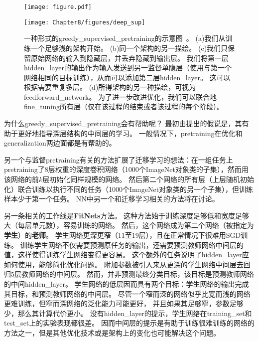 \begin{figure}[!htb]
\ifOpenSource
\centerline{\texttt{[image: figure.pdf]}}
\else
\centerline{\texttt{[image: Chapter8/figures/deep\_sup]}}
\fi
\caption{一种形式的\gls{greedy_supervised_pretraining}的示意图~\citep{Bengio-nips-2006-small}。
(a)我们从训练一个足够浅的架构开始。
(b)同一个架构的另一描绘。
(c)我们只保留原始网络的输入到隐藏层，并丢弃隐藏到输出层。 
我们将第一层\gls{hidden_layer}的输出作为输入发送到另一监督单隐层（使用与第一个网络相同的目标训练），从而可以添加第二层\gls{hidden_layer}。 
这可以根据需要重复多层。
(d)所得架构的另一种描绘，可视为\gls{feedforward_network}。 
为了进一步改进优化，我们可以联合地\gls{fine_tuning}所有层（仅在该过程的结束或者该过程的每个阶段）。
}
\label{fig:chap8_deep_sup}
\end{figure}


为什么\gls{greedy_supervised_pretraining}会有帮助呢？
最初由\cite{Bengio-nips-2006}提出的假说是，其有助于更好地指导深层结构的中间层的学习。
一般情况下，\gls{pretraining}在优化和\gls{generalization}两边面都是有帮助的。

另一个与监督\gls{pretraining}有关的方法扩展了迁移学习的想法：\cite{yosinski-nips2014}在一组任务上\gls{pretraining}了$8$层权重的深度卷积网络（1000个ImageNet对象类的子集），然而用该网络的前$k$层初始化同样规模的网络。
然后第二个网络的所有层（上层随机初始化）联合训练以执行不同的任务（1000个ImageNet对象类的另一个子集），但训练样本少于第一个任务。
\gls{NN}中另一个和迁移学习相关的方法将在讨论。

另一条相关的工作线是\textbf{FitNets}\citep{Romero-et-al-ICLR2015-small}方法。
这种方法始于训练深度足够低和宽度足够大（每层单元数），容易训练的网络。
然后，这个网络成为第二个网络（被指定为\textbf{学生}）的\textbf{老师}。
学生网络更深更窄（11至19层），且在正常情况下很难用SGD训练。
训练学生网络不仅需要预测原任务的输出，还需要预测教师网络中间层的值，这样使得训练学生网络变得更容易。
这个额外的任务说明了\gls{hidden_layer}应如何使用，能够简化优化问题。
附加参数被引入来从更深的学生网络中间层去回归$5$层教师网络的中间层。
然而，并非预测最终分类目标，该目标是预测教师网络的中间\gls{hidden_layer}。
学生网络的低层因而具有两个目标：学生网络的输出完成其目标，和预测教师网络的中间层。
尽管一个窄而深的网络似乎比宽而浅的网络更难训练，但窄而深网络的泛化能力可能更好，
并且如果其足够窄，参数足够少，那么其计算代价更小。
没有\gls{hidden_layer}的提示，学生网络在\gls{training_set}和\gls{test_set}上的实验表现都很差。
因而中间层的提示是有助于训练很难训练的网络的方法之一，但是其他优化技术或是架构上的变化也可能解决这个问题。

